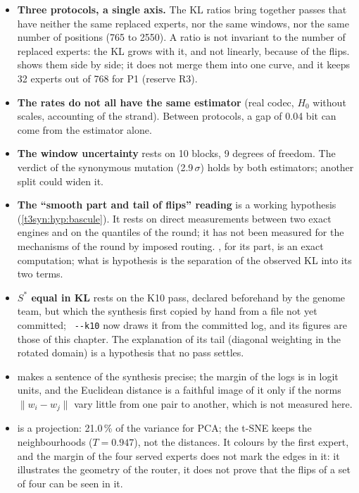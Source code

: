 \begin{faux}
\begin{itemize}
\item \textbf{Three protocols, a single axis.} The KL ratios bring together passes that have neither the same replaced experts, nor the same windows, nor the same number of positions (765 to \num{2550}). A ratio is not invariant to the number of replaced experts: the KL grows with it, and not linearly, because of the flips.  shows them side by side; it does not merge them into one curve, and it keeps 32 experts out of 768 for P1 (reserve R3).
\item \textbf{The rates do not all have the same estimator} (real codec, $H_0$ without scales, accounting of the strand). Between protocols, a gap of 0.04 bit can come from the estimator alone.
\item \textbf{The window uncertainty} rests on 10 blocks, 9 degrees of freedom. The verdict of the synonymous mutation (2.9\,$\sigma$) holds by both estimators; another split could widen it.
\item \textbf{The ``smooth part and tail of flips'' reading} is a working hypothesis (\cref{t3syn:hyp:bascule}). It rests on direct measurements between two exact engines and on the quantiles of the round; it has not been measured for the mechanisms of the round by imposed routing. , for its part, is an exact computation; what is hypothesis is the separation of the observed KL into its two terms.
\item \textbf{$S^{*}$ equal in KL} rests on the K10 pass, declared beforehand by the genome team, but which the synthesis first copied by hand from a file not yet committed; ~\texttt{-{}-k10} now draws it from the committed log, and its figures are those of this chapter. The explanation of its tail (diagonal weighting in the rotated domain) is a hypothesis that no pass settles.
\item \textbf{} makes a sentence of the synthesis precise; the margin of the logs is in logit units, and the Euclidean distance is a faithful image of it only if the norms $\|w_i - w_j\|$ vary little from one pair to another, which is not measured here.
\item \textbf{} is a projection: 21.0\,\% of the variance for PCA; the t-SNE keeps the neighbourhoods ($T = 0.947$), not the distances. It colours by the first expert, and the margin of the four served experts does not mark the edges in it: it illustrates the geometry of the router, it does not prove that the flips of a set of four can be seen in it.

\end{itemize}
\end{faux}
